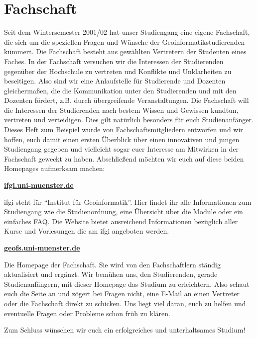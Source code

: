 \section*{Fachschaft}
Seit dem Wintersemester 2001/02 hat unser Studiengang eine eigene Fachschaft, die sich um die speziellen Fragen und Wünsche der Geoinformatikstudierenden kümmert. Die Fachschaft besteht aus gewählten Vertretern der Studenten eines Faches. In der Fachschaft versuchen wir die Interessen der Studierenden gegenüber der Hochschule zu vertreten und Konﬂikte und Unklarheiten zu beseitigen. Also sind wir eine Anlaufstelle für Studierende und Dozenten gleichermaßen, die die Kommunikation unter den Studierenden und mit den Dozenten fördert, z.B. durch übergreifende Veranstaltungen. Die Fachschaft will die Interessen der Studierenden nach bestem Wissen und Gewissen kundtun, vertreten und verteidigen. Dies gilt natürlich besonders für euch Studienanfänger. Dieses Heft zum Beispiel wurde von Fachschaftsmitgliedern entworfen und wir hoffen, euch damit einen ersten Überblick über einen innovativen und jungen Studiengang gegeben und vielleicht sogar euer Interesse am Mitwirken in der Fachschaft geweckt zu haben. Abschließend möchten wir euch auf diese beiden Homepages aufmerksam machen:

\begin{center}
\textbf{\url{ifgi.uni-muenster.de}}\\
\end{center}

ifgi steht für "`Institut für Geoinformatik"'. Hier ﬁndet ihr alle Informationen zum Studiengang wie die Studienordnung, eine Übersicht über die Module oder ein einfaches FAQ. Die Website bietet ausreichend Informationen bezüglich aller Kurse und Vorlesungen die am ifgi angeboten werden.

\begin{center}
\textbf{\url{geofs.uni-muenster.de}}\\
\end{center}

Die Homepage der Fachschaft. Sie wird von den Fachschaftlern ständig aktualisiert und ergänzt. Wir bemühen uns, den Studierenden, gerade Studienanfängern, mit dieser Homepage das Studium zu erleichtern. Also schaut euch die Seite an und zögert bei Fragen nicht, eine E-Mail an einen Vertreter oder die Fachschaft direkt zu schicken. Uns liegt viel daran, euch zu helfen und eventuelle Fragen oder Probleme schon früh zu klären.

Zum Schluss wünschen wir euch ein erfolgreiches und unterhaltsames Studium!

